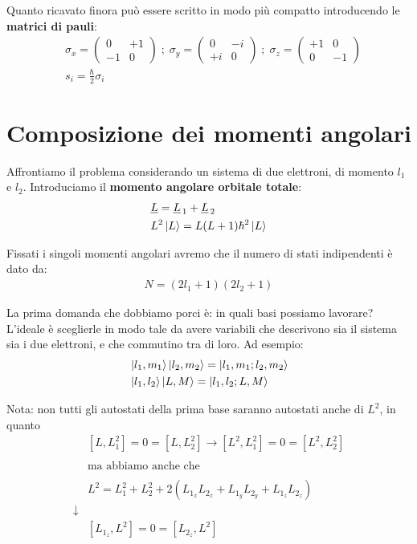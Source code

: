 Quanto ricavato finora può essere scritto in modo più compatto introducendo le \textbf{matrici di pauli}:
\begin{align}
{}&\sigma_x = \left(
\begin{array}{ccc}
0 & +1 \\
-1 & 0
\end{array}
\right) \; ; \;
\sigma_y = \left(
\begin{array}{ccc}
0 & -i \\
+i & 0
\end{array}
\right) \; ; \;
\sigma_z = \left(
\begin{array}{ccc}
+1 & 0 \\
0 & -1
\end{array}
\right) \\
&s_i= \frac{\hbar}{2}\sigma_i
\end{align}
\newpage
\section{Composizione dei momenti angolari}

Affrontiamo il problema considerando un sistema di due elettroni, di momento $l_1$ e $l_2$. Introduciamo il \textbf{momento angolare orbitale totale}:
\begin{align}
{}&\underline{L}=\underline{L}_{\, 1} + \underline{L}_{\, 2} \\
&L^2\ket{L} = L(L+1)\hbar^2\ket{L}
\end{align}

Fissati i singoli momenti angolari avremo che il numero di stati indipendenti è dato da:
\begin{align}
N=(2l_1 + 1)(2l_2 + 1)
\end{align}

La prima domanda che dobbiamo porci è: in quali basi possiamo lavorare? L'ideale è sceglierle in modo tale da avere variabili che descrivono sia il sistema sia i due elettroni, e che commutino tra di loro. Ad esempio:
\begin{align}
{}&\ket{l_1,m_1}\ket{l_2,m_2}=\ket{l_1,m_1; l_2,m_2} \\
&\ket{l_1,l_2}\ket{L,M}= \ket{l_1,l_2; L,M}
\end{align}

Nota: non tutti gli autostati della prima base saranno autostati anche di $L^2$, in quanto
\begin{align}
{}&[L,L_1^2]=0=[L,L_2^2] \rightarrow [L^2,L_1^2]=0=[L^2,L_2^2] \\
\nonumber \\
&\text{ma abbiamo anche che} \nonumber \\
\nonumber \\
&L^2= L_1^2 + L_2^2 + 2(L_{1_x}L_{2_x} + L_{1_y}L_{2_y} + L_{1_z}L_{2_z})\nonumber \\
\downarrow \nonumber \\
&[L_{1_z},L^2]=0=[L_{2_z},L^2]
\end{align}

